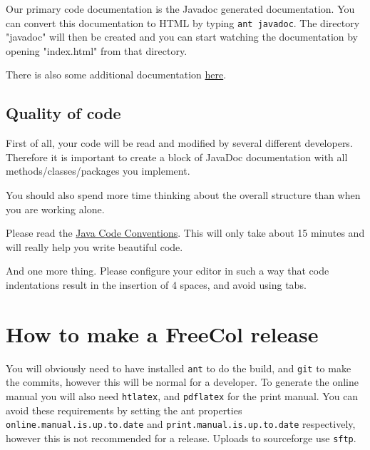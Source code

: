 \documentclass[12pt]{book}
\begin{document}
Our primary code documentation is the Javadoc generated
documentation. You can convert this documentation to HTML by
typing \verb+ant javadoc+. The directory "javadoc" will then be
created and you can start watching the documentation by opening
"index.html" from that directory.

There is also some additional documentation
\href{http://www.freecol.org/documentation/}{here}.


\hypertarget{Quality of code}{\section{Quality of code}}

First of all, your code will be read and modified by several
different developers.  Therefore it is important to create a
block of JavaDoc documentation with all methods/classes/packages
you implement.

You should also spend more time thinking about the overall
structure than when you are working alone.

Please read the \href{http://java.sun.com/docs/codeconv/}{Java Code
  Conventions}.  This will only take about 15 minutes and will really
help you write beautiful code.

And one more thing.  Please configure your editor in such a way
that code indentations result in the insertion of 4 spaces, and avoid
using tabs.


\hypertarget{How to build a FreeCol release}{\chapter{How to make a FreeCol release}}

You will obviously need to have installed \texttt{ant} to do the
build, and \texttt{git} to make the commits, however this will be
normal for a developer.  To generate the online manual you will also
need \texttt{htlatex}, and \texttt{pdflatex} for the print manual.
You can avoid these requirements by setting the ant properties
\texttt{online.manual.is.up.to.date} and
\texttt{print.manual.is.up.to.date} respectively, however this is not
recommended for a release.  Uploads to sourceforge use \texttt{sftp}.
\end{document}
